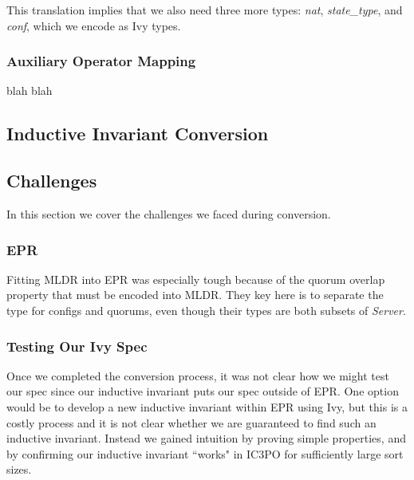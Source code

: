 \documentclass[12pt]{article}
\begin{document}
This translation implies that we also need three more types: \textit{nat}, \textit{state\_type}, and \textit{conf}, which we encode as Ivy types.

\subsubsection{Auxiliary Operator Mapping}

blah blah


\subsection{Inductive Invariant Conversion}


\subsection{Challenges}

In this section we cover the challenges we faced during conversion.

\subsubsection{EPR}

Fitting MLDR into EPR was especially tough because of the quorum overlap property that must be encoded into MLDR.  They key here is to separate the type for configs and quorums, even though their types are both subsets of \textit{Server}.

\subsubsection{Testing Our Ivy Spec}

Once we completed the conversion process, it was not clear how we might test our spec since our inductive invariant puts our spec outside of EPR.  One option would be to develop a new inductive invariant within EPR using Ivy, but this is a costly process and it is not clear whether we are guaranteed to find such an inductive invariant.  Instead we gained intuition by proving simple properties, and by confirming our inductive invariant ``works" in IC3PO for sufficiently large sort sizes.




\end{document}
